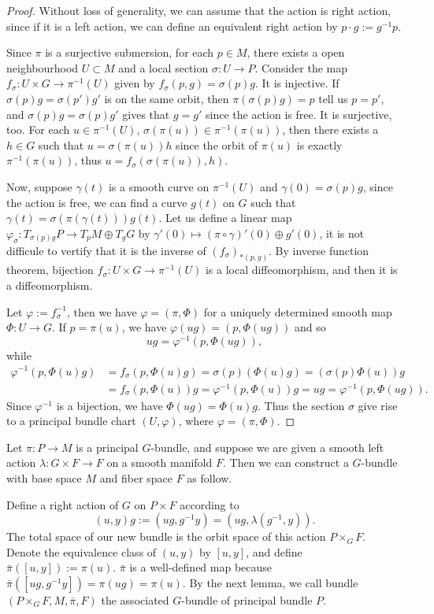 \begin{proof}
	Without loss of generality, we can assume that the action is right action, since if it is a left action, we can define an equivalent right action by $p\cdot g:=g^{-1}p$.
	
	Since $\pi$ is a surjective submersion, for each $p\in M$, there exists a open neighbourhood $U\subset M$ and a local section $\sigma:U\to P$. Consider the map $f_\sigma:U\times G\to \pi^{-1}(U)$ given by $f_\sigma(p,g)=\sigma(p)g$. It is injective. If $\sigma(p)g=\sigma(p')g'$ is on the same orbit, then $\pi(\sigma(p)g)=p$ tell us $p=p'$, and $\sigma(p)g=\sigma(p)g'$ gives that $g=g'$ since the action is free. It is surjective, too. For each $u\in \pi^{-1}(U)$, $\sigma(\pi(u))\in \pi^{-1}(\pi(u))$, then there exists a $h\in G$ such that $u = \sigma(\pi(u))h$ since the orbit of $\pi(u)$ is exactly $\pi^{-1}(\pi(u))$, thus $u= f_\sigma(\sigma(\pi(u)),h)$.
	
	Now, suppose $\gamma(t)$ is a smooth curve on $\pi^{-1}(U)$ and $\gamma(0)=\sigma(p)g$, since the action is free, we can find a curve $g(t)$ on $G$ such that $\gamma(t)=\sigma(\pi(\gamma(t)))g(t)$. Let us define a linear map $\varphi_\sigma: T_{\sigma(p)g}P\to T_{p}M\oplus T_{g}G$ by $\gamma'(0) \mapsto (\pi\circ \gamma)'(0)\oplus g'(0)$, it is not difficule to vertify that it is the inverse of $(f_\sigma)_{*(p,g)}$. By inverse function theorem, bijection $f_\sigma:U\times G\to \pi^{-1}(U)$ is a local diffeomorphism, and then it is a diffeomorphism.
	
	Let $\varphi:=f_\sigma^{-1}$, then we have $\varphi=(\pi,\Phi)$ for a uniquely determined smooth map $\Phi:U\to G$. If $p=\pi(u)$, we have $\varphi(ug)=(p,\Phi(ug))$ and so
	\[
		ug=\varphi^{-1}(p,\Phi(ug)),
	\]
	while
	\[
	\begin{aligned}
		\varphi^{-1}(p,\Phi(u)g)&=f_\sigma(p,\Phi(u)g)=\sigma(p)(\Phi(u)g)=(\sigma(p)\Phi(u))g\\
		&=f_\sigma(p,\Phi(u))g=\varphi^{-1}(p,\Phi(u))g=ug=\varphi^{-1}(p,\Phi(ug)).
	\end{aligned}
	\]
	Since $\varphi^{-1}$ is a bijection, we have $\Phi(ug)=\Phi(u)g$. Thus the 	section $\sigma$ give rise to a principal bundle chart $(U,\varphi)$, where $\varphi=(\pi,\Phi)$.
\end{proof}

\begin{para}\label{11}
	Let $\pi:P\to M$ is a principal $G$-bundle, and suppose we are given a smooth left action $\lambda:G\times F\to F$ on a smooth manifold $F$. Then we can construct a $G$-bundle with base space $M$ and fiber space $F$ as follow.

	Define a right action of $G$ on $P\times F$ according to
	\[
	(u,y)g:=(ug,g^{-1}y)=(ug,\lambda(g^{-1},y)).
	\]
	The total space of our new bundle is the orbit space of this action $P\times_G F$. Denote the equivalence class of $(u,y)$ by $[u,y]$, and define $\bar{\pi}([u,y]):=\pi(u)$. $\bar{\pi}$ is a well-defined map because $\bar{\pi}([ug,g^{-1}y])=\pi(ug)=\pi(u)$. By the next lemma, we call bundle $(P\times_G F,M,\bar{\pi},F)$ the associated $G$-bundle of principal bundle $P$. 
\end{para}

